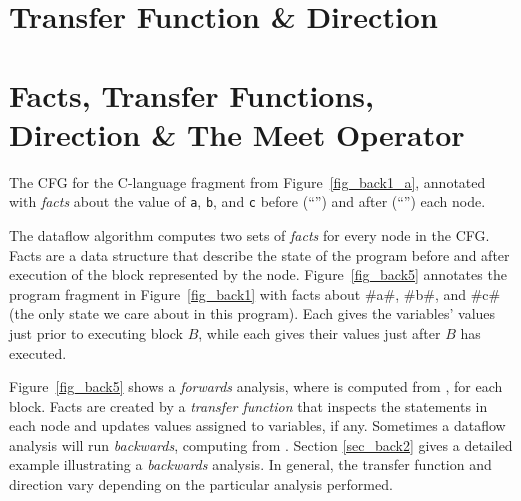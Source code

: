 \documentclass[12pt]{report}
\begin{document}



\section{Transfer Function \& Direction}
\label{back_subsec_transfer}



\section{Facts, Transfer Functions, Direction \& The Meet Operator}
\label{sec_back4}

\begin{myfig}[th]
\centering

\caption{The CFG for the C-language fragment from
  Figure~\ref{fig_back1_a}, annotated with \emph{facts} about the
  value of \texttt{a}, \texttt{b}, and \texttt{c} before (``\inBa'') and
  after (``\outBa'') each node.}
\label{fig_back5}
\end{myfig}

The dataflow algorithm computes two sets of \emph{facts} for every
node in the CFG. Facts are a data structure that describe the state of
the program before and after execution of the block represented by the
node. Figure~\ref{fig_back5} annotates the program fragment in
Figure~\ref{fig_back1} with facts about #a#, #b#, and #c# (the only
state we care about in this program). Each \inBa gives the variables'
values just prior to executing block $B$, while each \outBa gives
their values just after $B$ has executed.  

Figure~\ref{fig_back5} shows a \emph{forwards} analysis, where \outBa
is computed from \inBa, for each block. Facts are created by a
\emph{transfer function} that inspects the statements in each node and
updates values assigned to variables, if any. Sometimes a dataflow
analysis will run \emph{backwards}, computing \inBa from
\outBa. Section \ref{sec_back2} gives a detailed example illustrating
a \emph{backwards} analysis. In general, the transfer function and
direction vary depending on the particular analysis performed.
\end{document}
